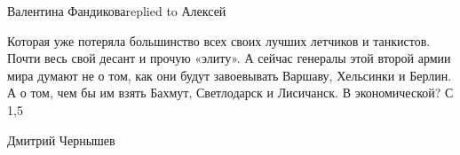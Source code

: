 Валентина Фандиковаreplied to Алексей

Которая уже потеряла большинство всех своих лучших летчиков и танкистов. Почти весь свой десант и прочую «элиту». А сейчас генералы этой второй армии мира думают не о том, как они будут завоевывать Варшаву, Хельсинки и Берлин. А о том, чем бы им взять Бахмут, Светлодарск и Лисичанск. В экономической? С 1,5%

Дмитрий Чернышев
